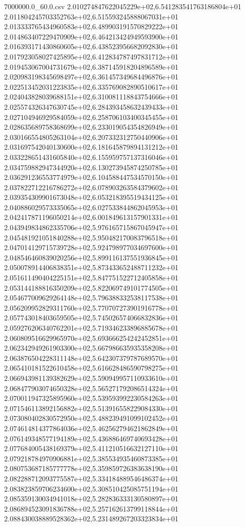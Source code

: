 \begin{filecontents*}{7000000.0_60.0.csv}
2.010274847622045229e+02,6.541283541763186804e+01
2.011804245703352763e+02,6.515593245888067031e+01
2.013333765434960583e+02,6.489903191570829222e+01
2.014863407229470909e+02,6.464213424949593900e+01
2.016393171430860605e+02,6.438523956682092830e+01
2.017923058027425895e+02,6.412834787497831712e+01
2.019453067004731679e+02,6.387145918204896589e+01
2.020983198345698497e+02,6.361457349684496876e+01
2.022513452031223835e+02,6.335769082890510617e+01
2.024043828039688151e+02,6.310081118843754666e+01
2.025574326347630745e+02,6.284393458632439433e+01
2.027104946929584059e+02,6.258706103400345455e+01
2.028635689758368699e+02,6.233019054354826949e+01
2.030166554805263104e+02,6.207332312750440906e+01
2.031697542040130600e+02,6.181645879894131212e+01
2.033228651431605840e+02,6.155959757137316046e+01
2.034759882947344920e+02,6.130273945874250785e+01
2.036291236553774979e+02,6.104588447534570150e+01
2.037822712216786272e+02,6.078903263584379602e+01
2.039354309901673048e+02,6.053218395519434125e+01
2.040886029573335065e+02,6.027533844862045953e+01
2.042417871196050214e+02,6.001849613157901331e+01
2.043949834862335706e+02,5.976165715867045947e+01
2.045481921051840288e+02,5.950482170083796518e+01
2.047014129715739728e+02,5.924798977034697600e+01
2.048546460839020256e+02,5.899116137551936845e+01
2.050078914406838351e+02,5.873433652488711232e+01
2.051611490404225151e+02,5.847751522712405858e+01
2.053144188816350209e+02,5.822069749101774505e+01
2.054677009629264148e+02,5.796388332538117538e+01
2.056209952829311760e+02,5.770707273901916778e+01
2.057743018403659505e+02,5.745026574066832836e+01
2.059276206340762201e+02,5.719346233896885678e+01
2.060809516629965970e+02,5.693666254242452851e+01
2.062342949261903300e+02,5.667986635935358208e+01
2.063876504228311148e+02,5.642307379787689570e+01
2.065410181522610458e+02,5.616628486590798275e+01
2.066943981139382629e+02,5.590949957110933610e+01
2.068477903074650328e+02,5.565271792086514324e+01
2.070011947325895960e+02,5.539593992230584263e+01
2.071546113892156882e+02,5.513916558229084330e+01
2.073080402830572950e+02,5.488239491099102452e+01
2.074614814377864036e+02,5.462562794621862849e+01
2.076149348577194189e+02,5.436886469740693428e+01
2.077684005438169379e+02,5.411210516632127110e+01
2.079218784970906881e+02,5.385534935460873385e+01
2.080753687185777778e+02,5.359859726383638190e+01
2.082288712093775587e+02,5.334184889546486374e+01
2.083823859706234600e+02,5.308510425085751194e+01
2.085359130034941018e+02,5.282836333130580897e+01
2.086894523091836788e+02,5.257162613799118844e+01
2.088430038889528362e+02,5.231489267203323834e+01

\end{filecontents*}
